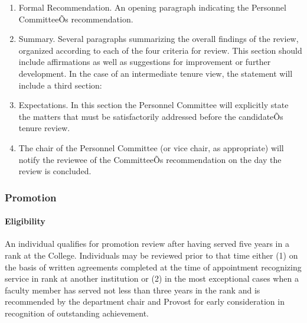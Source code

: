\documentclass[letterpaper, 11pt]{article}
\begin{document}
\begin{enumerate}[label=\arabic*)]
{						\begin{enumerate}[label=\arabic*)]
							\item{Formal Recommendation.  An opening paragraph indicating the Personnel CommitteeÕs recommendation.}
							\item{Summary.  Several paragraphs summarizing the overall findings of the review, organized according to each of the four criteria for review.  This section should include affirmations as well as suggestions for improvement or further development.
								In the case of an intermediate tenure view, the statement will include a third section:}
							\item{Expectations.  In this section the Personnel Committee will explicitly state the matters that must be satisfactorily addressed before the candidateÕs tenure review.}
							\item{  The chair of the Personnel Committee (or vice chair, as appropriate) will notify the reviewee of the CommitteeÕs recommendation on the day the review is concluded.}
						\end{enumerate}
					}
				\end{enumerate}
		\subsubsection{Promotion}
			\paragraph{Eligibility}
				An individual qualifies for promotion review after having served five years in a rank at the College.  Individuals may be reviewed prior to that time either (1) on the basis of written agreements completed at the time of appointment recognizing service in rank at another institution or (2) in the most exceptional cases when a faculty member has served not less than three years in the rank and is recommended by the department chair and Provost for early consideration in recognition of outstanding achievement.
\end{document}
